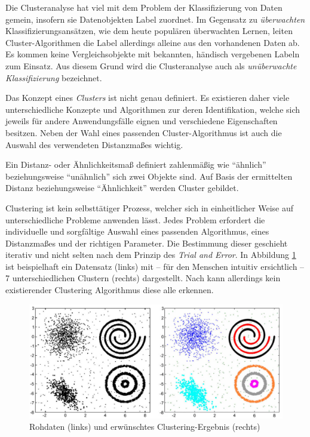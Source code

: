 Die Clusteranalyse hat viel mit dem Problem der Klassifizierung von Daten gemein, insofern sie Datenobjekten
Label zuordnet. Im Gegensatz zu \textit{überwachten} Klassifizierungsansätzen, wie dem heute populären überwachten
Lernen, leiten Cluster-Algorithmen die Label allerdings alleine aus den vorhandenen Daten ab.
Es kommen keine Vergleichsobjekte mit bekannten, händisch vergebenen Labeln zum Einsatz.
Aus diesem Grund wird die Clusteranalyse auch als \textit{unüberwachte Klassifizierung} bezeichnet. \cite[]{tan2007introduction}

Das Konzept eines \textit{Clusters} ist nicht genau definiert. Es existieren daher viele unterschiedliche Konzepte
und Algorithmen zur deren Identifikation, welche sich jeweils für andere Anwendungsfälle eignen und verschiedene Eigenschaften
besitzen. Neben der Wahl eines passenden Cluster-Algorithmus ist auch die Auswahl des verwendeten Distanzmaßes wichtig.

\begin{theorem}[Distanzmaß]
    Ein Distanz- oder Ähnlichkeitsmaß definiert zahlenmäßig wie ``ähnlich'' beziehungsweise ``unähnlich''
    sich zwei Objekte sind. Auf Basis der ermittelten Distanz beziehungsweise ``Ähnlichkeit'' werden
    Cluster gebildet.
\end{theorem}

Clustering ist kein selbsttätiger Prozess, welcher sich in
einheitlicher Weise auf unterschiedliche Probleme anwenden lässt. Jedes Problem erfordert die individuelle und sorgfältige
Auswahl eines passenden Algorithmus, eines Distanzmaßes und der richtigen Parameter. Die Bestimmung dieser geschieht
iterativ und nicht selten nach dem Prinzip des \textit{Trial and Error}. In Abbildung \ref{fig:grund_clustering_example}
ist beispielhaft ein Datensatz (links) mit -- für den Menschen intuitiv ersichtlich -- 7 unterschiedlichen Clustern (rechts)
dargestellt. Nach \cite[]{Jain2010} kann allerdings kein existierender Clustering Algorithmus diese alle erkennen.
\cite[]{Jain1999, tan2007introduction}

\begin{figure}[H]
    \centering
    \includegraphics[width=0.8\linewidth]{resources/img/grundlagen/clustering_example}
    \caption[Rohdaten und erwünschtes Clustering-Ergebnis]{Rohdaten (links) und erwünschtes Clustering-Ergebnis (rechts) \cite[]{Jain2010}}
    \label{fig:grund_clustering_example}
\end{figure}

